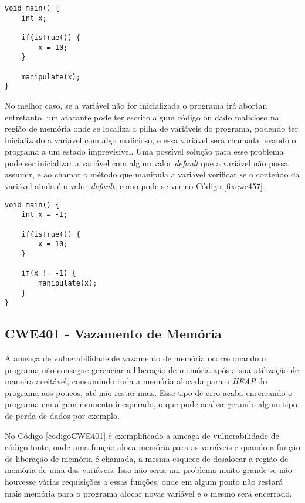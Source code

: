 \begin{lstlisting}[caption={Código exemplo CWE457}, label=codigocwe457]
void main() {
    int x;

    if(isTrue()) {
        x = 10;
    }

    manipulate(x);   
}
\end{lstlisting}

No melhor caso, se a variável não for inicializada o programa irá abortar,
entretanto, um atacante pode ter escrito algum código ou dado malicioso na
região de memória onde se localiza a pilha de variáveis do programa, podendo ter
inicializado a variável com algo malicioso, e essa variável será chamada
levando o programa a um estado imprevisível. Uma possível solução para esse
problema pode ser inicializar a variável com algum valor \textit{default} que a
variável não possa assumir, e ao chamar o método que manipula a variável
verificar se o conteúdo da variável ainda é o valor \textit{default}, como
pode-se ver no Código \ref{fixcwe457}.

\begin{lstlisting}[caption={Evitando ameaça de vulnerabilidade CWE457},
label=fixcwe457]
void main() {
    int x = -1;

    if(isTrue()) {
        x = 10;
    }

    if(x != -1) {
        manipulate(x);   
    }
}
\end{lstlisting}

\subsection{CWE401 - Vazamento de Memória}\label{cwe401}

A ameaça de vulnerabilidade de vazamento de memória ocorre quando o programa não
consegue gerenciar a liberação de memória após a sua utilização de maneira
aceitável, consumindo toda a memória alocada para o \textit{HEAP} do programa aos
poucos, até não restar mais. Esse tipo de erro acaba encerrando o programa em
algum momento inesperado, o que pode acabar gerando algum tipo de perda de dados
por exemplo.

No Código \ref{codigoCWE401} é exemplificado a ameaça de vulnerabilidade de
código-fonte, onde uma função aloca memória para as variáveis e quando a função
de liberação de memória é chamada, a mesma esquece de desalocar a região de
memória de uma das variáveis. Isso não seria um problema muito grande se não
houvesse várias requisições a essas funções, onde em algum ponto não restará
mais memória para o programa alocar novas variável e o mesmo será encerrado.


